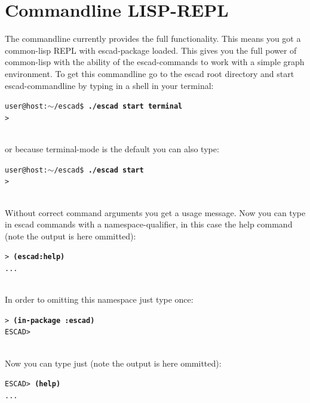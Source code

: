 \documentclass[a4paper, 12pt, openany]{scrbook}
\makeatletter
\newcommand{\shellcmdline}[2]{\\
  \setlength{\fboxsep}{2pt}\colorbox{black!20}{\parbox{\textwidth}{\texttt{user@host:$\sim$/escad\$ \textbf{#1}\\#2}}}\\}
\newcommand{\escadcmdline}[2]{\\\setlength{\fboxsep}{2pt}\colorbox{black!20}{\parbox{\textwidth}{\texttt{ESCAD> \textbf{#1}\\#2}}}\\}
\newcommand{\lispcmdline}[2]{\\\setlength{\fboxsep}{2pt}\colorbox{black!20}{\parbox{\textwidth}{\texttt{> \textbf{#1}\\#2}}}\\}
\makeatother
\begin{document}
\section{Commandline LISP-REPL}\label{sec:cmd_line}
The commandline currently provides the full functionality. This means you got a common-lisp REPL with escad-package loaded. This gives you the full power of common-lisp with the ability of the escad-commands to work with a simple graph environment. To get this commandline go to the escad root directory and start escad-commandline by typing in a shell in your terminal:
\shellcmdline{./escad start terminal}{>}
or because terminal-mode is the default you can also type:
\shellcmdline{./escad start}{>}
Without correct command arguments you get a usage message.
Now you can type in escad commands with a namespace-qualifier, in this case the help command (note the output is here ommitted):
\lispcmdline{(escad:help)}{...}
In order to omitting this namespace just type once:
\lispcmdline{(in-package :escad)}{ESCAD>}
Now you can type just (note the output is here ommitted):
\escadcmdline{(help)}{...}
\end{document}

